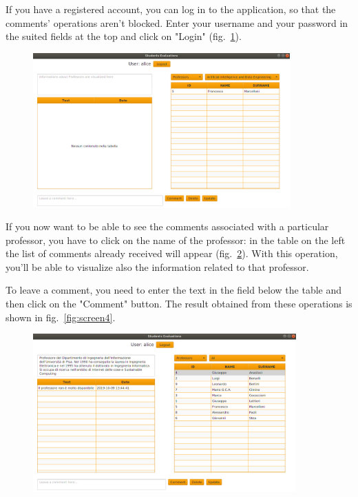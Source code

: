 \documentclass[a4paper, oneside]{article}
\begin{document}
If you have a registered account, you can log in to the application, so that the comments' operations aren't blocked. Enter your username and your password in the suited fields at the top and click on "Login" (fig.~\ref{fig:screenLogin}).
\begin{figure}[h]
\centering
\includegraphics[width=0.88\textwidth]{images/screens/screenLogin}
\label{fig:screenLogin}
\end{figure}

If you now want to be able to see the comments associated with a particular professor, you have to click on the name of the professor: in the table on the left the list of comments already received will appear (fig.~\ref{fig:screen3}). With this operation, you'll be able to visualize also the information related to that professor.

To leave a comment, you need to enter the text in the field below the table and then click on the "Comment" button. The result obtained from these operations is shown in fig.~\ref{fig:screen4}.

\begin{figure}
\centering
\includegraphics[width=0.9\textwidth]{images/screens/screen3}
\label{fig:screen3}
\end{figure}
\end{document}
